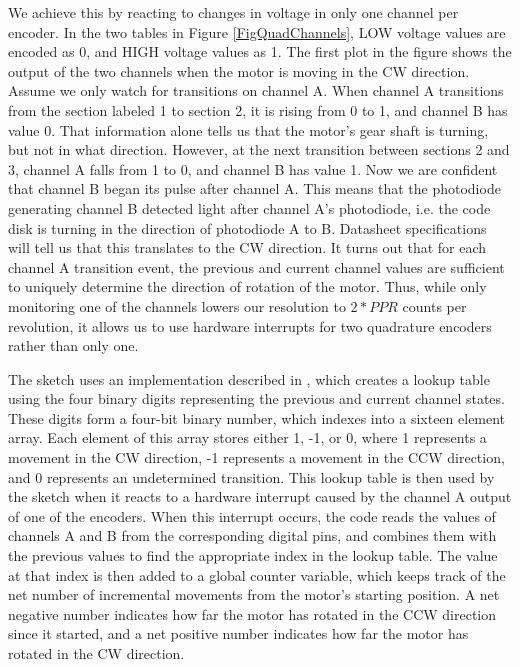 We achieve this by reacting to changes in voltage in only one channel per encoder. In the two tables in Figure \ref{FigQuadChannels}, LOW voltage values are encoded as 0, and HIGH voltage values as 1. The first plot in the figure shows the output of the two channels when the motor is moving in the CW direction. Assume we only watch for transitions on channel A. When channel A transitions from the section labeled 1 to section 2, it is rising from 0 to 1, and channel B has value 0. That information alone tells us that the motor's gear shaft is turning, but not in what direction. However, at the next transition between sections 2 and 3, channel A falls from 1 to 0, and channel B has value 1. Now we are confident that channel B began its pulse after channel A. This means that the photodiode generating channel B detected light after channel A's photodiode, i.e. the code disk is turning in the direction of photodiode A to B. Datasheet specifications will tell us that this translates to the CW direction. It turns out that for each channel A transition event, the previous and current channel values are sufficient to uniquely determine the direction of rotation of the motor. Thus, while only monitoring one of the channels lowers our resolution to \(2 * PPR\) counts per revolution, it allows us to use hardware interrupts for two quadrature encoders rather than only one. \cite{encoderBlog}

The sketch uses an implementation described in \cite{encoderBlog}, which creates a lookup table using the four binary digits representing the previous and current channel states. These digits form a four-bit binary number, which indexes into a sixteen element array. Each element of this array stores either 1, -1, or 0, where 1 represents a movement in the CW direction, -1 represents a movement in the CCW direction, and 0 represents an undetermined transition. This lookup table is then used by the sketch when it reacts to a hardware interrupt caused by the channel A output of one of the encoders. When this interrupt occurs, the code reads the values of channels A and B from the corresponding digital pins, and combines them with the previous values to find the appropriate index in the lookup table. The value at that index is then added to a global counter variable, which keeps track of the net number of incremental movements from the motor's starting position. A net negative number indicates how far the motor has rotated in the CCW direction since it started, and a net positive number indicates how far the motor has rotated in the CW direction. \cite{encoderBlog}

